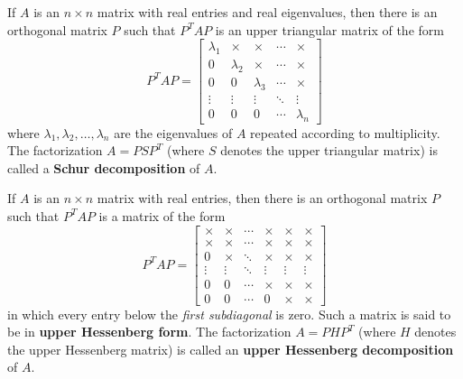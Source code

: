 \documentclass{article}
\theoremstyle{mystyle}
\begin{document}
\begin{tcolorbox}[colback=red!4, colframe=red!60!black,
  title={\textbf{Theorem 7.2.3 --- Schur's Theorem}}, boxrule=0.5mm, arc=3mm]
If $A$ is an $n\times n$ matrix with real entries and real eigenvalues, then there is an
orthogonal matrix $P$ such that $P^T AP$ is an upper triangular matrix of the form
\begin{equation}
  P^T AP = \begin{bmatrix}
    \lambda_1 & \times & \times & \cdots & \times\\
    0 & \lambda_2 & \times & \cdots & \times\\
    0 & 0 & \lambda_3 & \cdots & \times\\
    \vdots & \vdots & \vdots & \ddots & \vdots\\
    0 & 0 & 0 & \cdots & \lambda_n
  \end{bmatrix}
  \tag{11}
\end{equation}
where $\lambda_1,\lambda_2,\ldots,\lambda_n$ are the eigenvalues of $A$ repeated according
to multiplicity. The factorization $A = PSP^T$ (where $S$ denotes the upper triangular matrix)
is called a \textbf{Schur decomposition} of $A$.
\end{tcolorbox}

\begin{tcolorbox}[colback=red!4, colframe=red!60!black,
  title={\textbf{Theorem 7.2.4 --- Hessenberg's Theorem}}, boxrule=0.5mm, arc=3mm]
If $A$ is an $n\times n$ matrix with real entries, then there is an orthogonal matrix $P$
such that $P^T AP$ is a matrix of the form
\begin{equation}
  P^T AP = \begin{bmatrix}
    \times & \times & \cdots & \times & \times & \times\\
    \times & \times & \cdots & \times & \times & \times\\
    0 & \times & \ddots & \times & \times & \times\\
    \vdots & \vdots & \ddots & \vdots & \vdots & \vdots\\
    0 & 0 & \cdots & \times & \times & \times\\
    0 & 0 & \cdots & 0 & \times & \times
  \end{bmatrix}
  \tag{13}
\end{equation}
in which every entry below the \emph{first subdiagonal} is zero. Such a matrix is said to
be in \textbf{upper Hessenberg form}. The factorization $A = PHP^T$ (where $H$ denotes
the upper Hessenberg matrix) is called an \textbf{upper Hessenberg decomposition} of $A$.
\end{tcolorbox}
\end{document}
